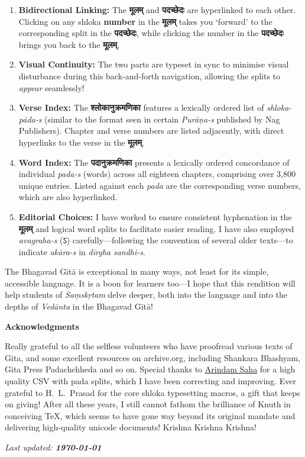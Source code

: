 \begin{enumerate}
\item \textbf{Bidirectional Linking:} The \textbf{मूलम्} and \textbf{पदच्छेदः} are hyperlinked to each other. Clicking on any shloka \textbf{number} in the \textbf{मूलम्} takes you `forward' to the corresponding split in the \textbf{पदच्छेदः}, while clicking the number in the \textbf{पदच्छेदः} brings you back to the \textbf{मूलम्}.
\item \textbf{Visual Continuity:} The two parts are typeset in sync to minimise visual disturbance during this back-and-forth navigation, allowing the splits to \emph{appear} seamlessly!
\item \textbf{Verse Index:} The \textbf{श्लोकानुक्रमणिका} features a lexically ordered list of \textit{shloka-pāda-s} (similar to the format seen in certain \textit{Purāṇa-s} published by Nag Publishers). Chapter and verse numbers are listed adjacently, with direct hyperlinks to the verse in the \textbf{मूलम्}.
\item \textbf{Word Index:} The \textbf{पदानुक्रमणिका} presents a lexically ordered concordance of individual \textit{pada-s} (words) across all eighteen chapters, comprising over 3,800 unique entries. Listed against each \textit{pada} are the corresponding verse numbers, which are also hyperlinked.
\item \textbf{Editorial Choices:} I have worked to ensure consistent hyphenation in the \textbf{मूलम्} and logical word splits to facilitate easier reading. I have also employed \textit{avagraha-s} (ऽ) carefully—following the convention of several older texts—to indicate \textit{akāra-s} in \textit{dīrgha sandhi-s}.
\end{enumerate}

The Bhagavad Gītā is exceptional in many ways, not least for its simple, accessible language. It is a boon for learners too—I hope that this rendition will help students of \textit{Saṃskṛtam} delve deeper, both into the language and into the depths of \textit{Vedānta} in the Bhagavad Gītā!

\vfill

\centerline{\large \textbf{Acknowledgments}}

\small Really grateful to all the selfless volunteers who have proofread various texts of Gita, and some excellent resources on archive.org, including Shankara Bhashyam, Gita Press Padachchheda and so on. Special thanks to \href{https://github.com/arindamsaha1507/Gita/}{Arindam Saha} for a high quality CSV with pada splits, which I have been correcting and improving. Ever grateful to H.~L.~Prasad for the core shloka typesetting macros, a gift that keeps on giving! After all these years, I still cannot fathom the brilliance of Knuth in conceiving \TeX, which seems to have gone way beyond its original mandate and delivering high-quality unicode documents! Krishna Krishna Krishna!

\bigskip

\centerline{\textit{\small Last updated: \textbf{\today}}}
\endgroup